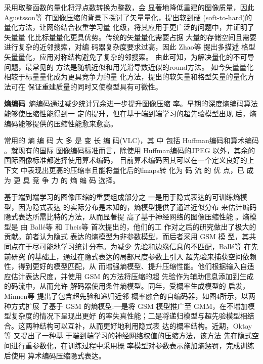 采用取整函数的量化将浮点数转换为整数，会 显著地降低重建的图像质量，因此 Agustsson等 \cite{agustsson2017soft} 在图像压缩的背景下探讨了矢量量化，提出软到硬 (soft-to-hard)的量化方法，让网络结合权重学习量 化级，将其应用于更广泛的问题中，并证明了矢量量 化比标量量化更具优势。传统的矢量量化需要占据 大量的存储空间且需要进行复杂的近邻搜索，对编 码器复杂度要求过高，因此 Zhao等 \cite{zhao2018multiple}提出多描述 格型矢量量化，应用对称结构避免了复杂的邻搜索。 由此可知，为解决量化的不可导问题，最常见的 方法是随机近似和用光滑导数近似的round方法。 如今矢量量化相较于标量量化成为更具竞争力的量 化方法，提出的软矢量和格型矢量的量化方法可在 保证重建质量的同时又使模型具有可微性。

\noindent\textbf{熵编码}~熵编码通过减少统计冗余进一步提升图像压缩 率。早期的深度熵编码算法能够使压缩性能得到一 定的提升，但在基于端到端学习的超先验模型出现 后，熵编码能够提供的压缩性能愈来愈高。

常用的 熵 编 码 大 多 是 变 长 编 码(VLC)，其 中 包括 Huffman编码和算术编码 \cite{rissanen1981universal}。就现有的国际 图像编码标准而言，除使用 Huffman编码的JPEG 以外，其余的国际图像标准都选择使用算术编码， 目前算术编码因其可以在一个定义良好的上下文 中表现出更高的压缩率且能将量化后的fmaps转 化为 码 流 的 优 点，已 成 为 更 具 竞 争 力 的 熵 编 码 选择。

基于端到端学习的图像压缩的重要组成部分之 一是用于隐式表达的可训练熵模型，因为隐式表达 的实际分布是未知的，熵模型提供了通过近似分布 来估计编码隐式表达所需比特的方法，从而显著提 高了基于神经网络的图像压缩性能 \cite{lee2018context}。熵模型是 由 Ballé等 \cite{balle2016end}和 Theis等 \cite{theis2017lossy}首次提出的，他们的工 作对之后的研究做出了极大的贡献。前者认为隐式 表达的熵模型为非参数模型，而后者采用 GSM 模 型，其共同点在于尽可能地学习统计分布。为减少 先验和边缘信息的不匹配，Ballé等 \cite{balle2018variational}在先前研究 的基础上，通过在隐式表达的局部尺度参数上引入 超先验来捕获空间依赖性，得到更好的模型匹配，从 而增强熵模型、提升压缩性能。他们根据输入自适 应估计表达尺度，并使用 GSM 的方法将压缩的超 先验作为辅助信息添加到生成的码流中，从而允许 解码器使用条件熵模型。同年，受概率生成模型的 启发，Minnen等 \cite{minnen2018joint}提出了包含超先验和递归近邻 概率融合的自编码器，如图4所示，以两种方式扩展 了基于 GSM 的熵模型:一是将 GSM 模型推广至 GMM，在不增加模型复杂度的情况下呈现出更好 的率失真性能；二是将递归模型与超先验模型相结合。这两种结构可以互补，从而更好地利用隐式表 达的概率结构。近期，Oktay等 \cite{oktay2019scalable}又提出了一种基 于端到端学习的神经网络权值的压缩方法，该方法 先在隐式空间进行重参数化，在训练过程中采用概 率模型对参数表示施加熵惩罚，完成训练后使用 算术编码压缩隐式表达。

